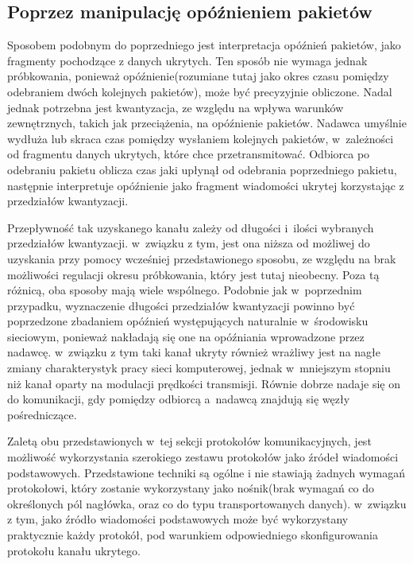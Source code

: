 \documentclass[a4paper, twoside, 12pt]{report}
\begin{document}
        \subsection{Poprzez manipulację opóźnieniem pakietów}
        Sposobem podobnym do poprzedniego jest interpretacja opóźnień pakietów,
        jako fragmenty pochodzące z danych ukrytych.\cite{IPDELAYCHANNEL} Ten sposób nie wymaga jednak próbkowania,
        ponieważ opóźnienie(rozumiane tutaj jako okres czasu pomiędzy odebraniem dwóch
        kolejnych pakietów), może być precyzyjnie obliczone. Nadal jednak potrzebna
        jest kwantyzacja, ze względu na wpływa warunków zewnętrznych, takich jak przeciążenia,
        na opóźnienie pakietów. Nadawca umyślnie wydłuża lub skraca czas pomiędzy
        wysłaniem kolejnych pakietów, w~zależności od fragmentu danych ukrytych,
        które chce przetransmitować. Odbiorca po odebraniu pakietu oblicza czas jaki
        upłynął od odebrania poprzedniego pakietu, następnie
        interpretuje opóźnienie jako fragment wiadomości ukrytej korzystając z
        przedziałów kwantyzacji.

        Przepływność tak uzyskanego kanału zależy od długości i~ilości wybranych
        przedziałów kwantyzacji. w~związku z tym, jest ona niższa od możliwej do
        uzyskania przy pomocy wcześniej przedstawionego sposobu, ze względu na brak
        możliwości regulacji okresu próbkowania, który jest tutaj nieobecny. Poza tą różnicą, oba sposoby mają
        wiele wspólnego. Podobnie jak w~poprzednim przypadku, wyznaczenie długości
        przedziałów kwantyzacji powinno być poprzedzone zbadaniem opóźnień występujących
        naturalnie w~środowisku sieciowym, ponieważ nakładają się one na opóźniania
        wprowadzone przez nadawcę. w~związku z tym taki kanał ukryty również wrażliwy jest
        na nagłe zmiany charakterystyk pracy sieci komputerowej, jednak w~mniejszym
        stopniu niż kanał oparty na modulacji prędkości transmisji. Równie dobrze
        nadaje się on do komunikacji, gdy pomiędzy odbiorcą a~nadawcą znajdują się
        węzły pośredniczące.

        Zaletą obu przedstawionych w~tej sekcji protokołów komunikacyjnych,
        jest możliwość wykorzystania szerokiego zestawu protokołów jako
        źródeł wiadomości podstawowych. Przedstawione techniki są ogólne i
        nie stawiają żadnych wymagań protokołowi, który zostanie wykorzystany jako
        nośnik(brak wymagań co do określonych pól nagłówka, oraz co do typu transportowanych danych).
        w~związku z tym, jako źródło wiadomości podstawowych może być wykorzystany
        praktycznie każdy protokół, pod warunkiem odpowiedniego skonfigurowania
        protokołu kanału ukrytego.
\end{document}
